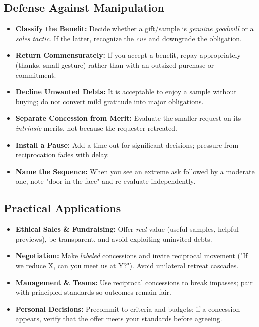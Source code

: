 \subsection*{Defense Against Manipulation}
\begin{itemize}
    \item \textbf{Classify the Benefit:} Decide whether a gift/sample is \emph{genuine goodwill} or a \emph{sales tactic}. If the latter, recognize the \emph{cue} and downgrade the obligation.
    \item \textbf{Return Commensurately:} If you accept a benefit, repay appropriately (thanks, small gesture) rather than with an outsized purchase or commitment.
    \item \textbf{Decline Unwanted Debts:} It is acceptable to enjoy a sample without buying; do not convert mild gratitude into major obligations.
    \item \textbf{Separate Concession from Merit:} Evaluate the smaller request on its \emph{intrinsic} merits, not because the requester retreated.
    \item \textbf{Install a Pause:} Add a time-out for significant decisions; pressure from reciprocation fades with delay.
    \item \textbf{Name the Sequence:} When you see an extreme ask followed by a moderate one, note "door-in-the-face" and re-evaluate independently.
\end{itemize}

\subsection*{Practical Applications}
\begin{itemize}
    \item \textbf{Ethical Sales \& Fundraising:} Offer \emph{real} value (useful samples, helpful previews), be transparent, and avoid exploiting uninvited debts.
    \item \textbf{Negotiation:} Make \emph{labeled} concessions and invite reciprocal movement ("If we reduce X, can you meet us at Y?"). Avoid unilateral retreat cascades.
    \item \textbf{Management \& Teams:} Use reciprocal concessions to break impasses; pair with principled standards so outcomes remain fair.
    \item \textbf{Personal Decisions:} Precommit to criteria and budgets; if a concession appears, verify that the offer meets your standards before agreeing.
\end{itemize}
